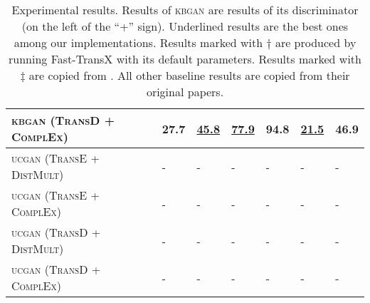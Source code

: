 \begin{table}[h]
\begin{tabular}{lllllll}
        \textsc{kbgan} (\textsc{TransD} + \textsc{ComplEx})   
        & 27.7 & \textbf{\underline{45.8}} & \underline{77.9}
        & 94.8 & \underline{21.5} & 46.9\\
        
         \midrule
         
          \textsc{ucgan} (\textsc{TransE} + \textsc{DistMult}) 
          & -  & - & - & - & - & - \\
         
         \textsc{ucgan} (\textsc{TransE} + \textsc{ComplEx}) 
          & -  & - & - & - & - & - \\
          
          \textsc{ucgan} (\textsc{TransD} + \textsc{DistMult}) 
          & -  & - & - & - & - & - \\
        
        \textsc{ucgan} (\textsc{TransD} + \textsc{ComplEx}) 
          & -  & - & - & - & - & - \\
          
        \bottomrule
    \end{tabular}
    \caption{Experimental results. Results of \textsc{kbgan} are results of its discriminator (on the left of the ``+'' sign). Underlined results are the best ones among our implementations. Results marked with $\dag$ are produced by running Fast-TransX \cite{lin2015learning} with its default parameters. Results marked with $\ddag$ are copied from \cite{conve}. All other baseline results are copied from their original papers.}
\label{tab:results}
\end{table}